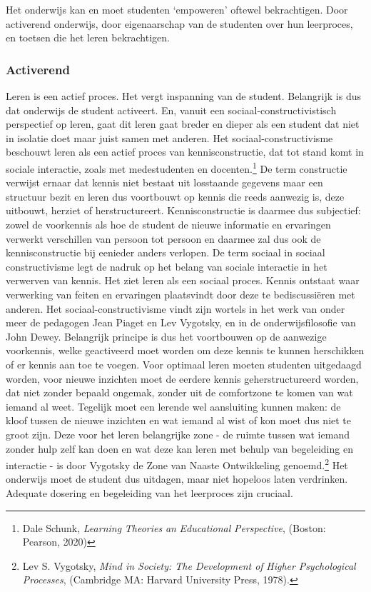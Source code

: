 \documentclass[smallauthor, chapterhaspagenum, nochapterinheader, pagenuminheader,  bigchapnum,medium2, tocpages,  garamond, titleinheader]{jote-book}
\begin{document}
	Het onderwijs kan en moet studenten ‘empoweren' oftewel bekrachtigen. Door activerend onderwijs, door eigenaarschap van de studenten over hun leerproces, en toetsen die het leren bekrachtigen.



	\subsubsection{Activerend}



	Leren is een actief proces. Het vergt inspanning van de student. Belangrijk is dus dat onderwijs de student activeert. En, vanuit een sociaal-constructivistisch perspectief op leren, gaat dit leren gaat breder en dieper als een student dat niet in isolatie doet maar juist samen met anderen. Het sociaal-constructivisme beschouwt leren als een actief proces van kennisconstructie, dat tot stand komt in sociale interactie, zoals met medestudenten en docenten.\footnote{Dale Schunk, \emph{Learning }\emph{Theories}\emph{ }\emph{an}\emph{ }\emph{Educational}\emph{ }\emph{Perspective},\emph{ }(Boston: Pearson, 2020)} De term constructie verwijst ernaar dat kennis niet bestaat uit losstaande gegevens maar een structuur bezit en leren dus voortbouwt op kennis die reeds aanwezig is, deze uitbouwt, herziet of herstructureert. Kennisconstructie is daarmee dus subjectief: zowel de voorkennis als hoe de student de nieuwe informatie en ervaringen verwerkt verschillen van persoon tot persoon en daarmee zal dus ook de kennisconstructie bij eenieder anders verlopen. De term sociaal in sociaal constructivisme legt de nadruk op het belang van sociale interactie in het verwerven van kennis. Het ziet leren als een sociaal proces. Kennis ontstaat waar verwerking van feiten en ervaringen plaatsvindt door deze te bediscussiëren met anderen. Het sociaal-constructivisme vindt zijn wortels in het werk van onder meer de pedagogen Jean Piaget en Lev Vygotsky, en in de onderwijsfilosofie van John Dewey. Belangrijk principe is dus het voortbouwen op de aanwezige voorkennis, welke geactiveerd moet worden om deze kennis te kunnen herschikken of er kennis aan toe te voegen. Voor optimaal leren moeten studenten uitgedaagd worden, voor nieuwe inzichten moet de eerdere kennis geherstructureerd worden, dat niet zonder bepaald ongemak, zonder uit de comfortzone te komen van wat iemand al weet. Tegelijk moet een lerende wel aansluiting kunnen maken: de kloof tussen de nieuwe inzichten en wat iemand al wist of kon moet dus niet te groot zijn. Deze voor het leren belangrijke zone - de ruimte tussen wat iemand zonder hulp zelf kan doen en wat deze kan leren met behulp van begeleiding en interactie - is door Vygotsky de Zone van Naaste Ontwikkeling genoemd.\footnote{Lev S. Vygotsky, \emph{Mind in Society: The Development of }\emph{Higher}\emph{ }\emph{Psychological}\emph{ }\emph{Processes}, (Cambridge MA: Harvard University Press, 1978).} Het onderwijs moet de student dus uitdagen, maar niet hopeloos laten verdrinken. Adequate dosering en begeleiding van het leerproces zijn cruciaal.
\end{document}
